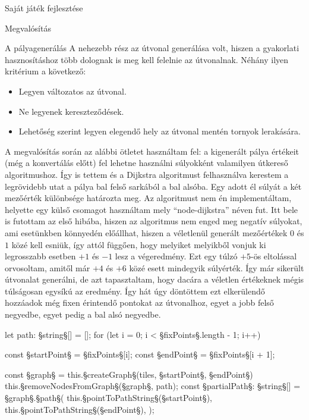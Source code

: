 \begin{MyChapter}{Saját játék fejlesztése}
\begin{MySection}{Megvalósítás}
\begin{MySubSection}{A pályagenerálás}
			A nehezebb rész az útvonal generálása volt, hiszen a gyakorlati hasznosításhoz több dolognak is meg kell felelnie az útvonalnak. Néhány ilyen kritérium a következő:
			\begin{itemize}
				\item Legyen változatos az útvonal.
				\item Ne legyenek kereszteződések.
				\item Lehetőség szerint legyen elegendő hely az útvonal mentén tornyok lerakására.
			\end{itemize}
			A megvalósítás során az alábbi ötletet használtam fel: a kigenerált pálya értékeit (még a konvertálás előtt) fel lehetne használni súlyokként valamilyen útkereső algoritmushoz. Így is tettem és a Dijkstra algoritmust \cite{dijkstra} felhasználva kerestem a legrövidebb utat a pálya bal felső sarkából a bal alsóba. Egy adott él súlyát a két mezőérték különbsége határozta meg. Az algoritmust nem én implementáltam, helyette egy külső csomagot használtam mely ``node-dijkstra'' néven fut. Itt bele is futottam az első hibába, hiszen az algoritmus nem enged meg negatív súlyokat, ami esetünkben könnyedén előállhat, hiszen a véletlenül generált mezőértékek $0$ és $1$ közé kell esniük, így attól függően, hogy melyiket melyikből vonjuk ki legrosszabb esetben $+1$ és $-1$ lesz a végeredmény. Ezt egy túlzó $+5$-ös eltolással orvosoltam, amitől már $+4$ és $+6$ közé esett mindegyik súlyérték. Így már sikerült útvonalat generálni, de azt tapasztaltam, hogy dacára a véletlen értékeknek mégis túlságosan egysíkú az eredmény. Így hát úgy döntöttem ezt elkerülendő hozzáadok még fixen érintendő pontokat az útvonalhoz, egyet a jobb felső negyedbe, egyet pedig a bal alsó negyedbe. 
			\begin{javascript}
let path: §\color{jsType}string§[] = [];
for (let i = 0; i < §\color{jsConst}fixPoints§.length - 1; i++) {
	const §\color{jsConst}startPoint§ = §\color{jsConst}fixPoints§[i];
	const §\color{jsConst}endPoint§ = §\color{jsConst}fixPoints§[i + 1];
	
	const §\color{jsConst}graph§ = this.§\color{jsMethod}createGraph§(tiles, §\color{jsConst}startPoint§, §\color{jsConst}endPoint§)
	this.§\color{jsMethod}removeNodesFromGraph§(§\color{jsConst}graph§, path);
	const §\color{jsConst}partialPath§: §\color{jsType}string§[] = §\color{jsConst}graph§.§\color{jsMethod}path§(
		this.§\color{jsMethod}pointToPathString§(§\color{jsConst}startPoint§),
		this.§\color{jsMethod}pointToPathString§(§\color{jsConst}endPoint§),
	);
	
}
\end{javascript}
\end{MySubSection}
\end{MySection}
\end{MyChapter}
